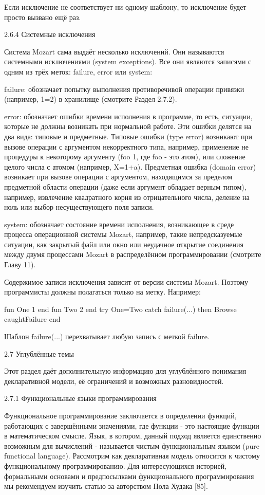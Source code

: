 Если исключение не соответствует ни одному шаблону, то исключение будет просто вызвано ещё раз.

2.6.4 Системные исключения

Система Mozart сама выдаёт несколько исключений. Они называются системными исключениями (system exceptions). Все они являются записями с одним из трёх меток: failure, error или system:

failure: обозначает попытку выполнения противоречивой операции привязки (например, 1=2) в хранилище (смотрите Раздел 2.7.2).

error: обозначает ошибки времени исполнения в программе, то есть, ситуации, которые не должны возникать при нормальной работе. Эти ошибки делятся на два вида: типовые и предметные. Типовые ошибки (type error) возникают при вызове операции с аргументом некорректного типа, например, применение не процедуры к некоторому аргументу ({foo 1}, где foo - это атом), или сложение целого числа с атомом (например, X=1+a). Предметная ошибка (domain error) возникает при вызове операции с аргументом, находящимся за пределом предметной области операции (даже если аргумент обладает верным типом), например, извлечение квадратного корня из отрицательного числа, деление на ноль или выбор несуществующего поля записи.

system: обозначает состояние времени исполнения, возникающее в среде процесса операционной системы Mozart, например, такие непредсказуемые ситуации, как закрытый файл или окно или неудачное открытие соединения между двумя процессами Mozart в распределённом программировании (смотрите Главу 11).

Содержимое записи исключения зависит от версии системы Mozart. Поэтому программисты должны полагаться только на метку. Например:

fun {One} 1 end
fun {Two} 2 end
try {One}={Two}
catch
failure(...) then {Browse caughtFailure}
end

Шаблон failure(...) перехватывает любую запись с меткой failure.

2.7 Углублённые темы

Этот раздел даёт дополнительную информацию для углублённого понимания декларативной модели, её ограничений и возможных разновидностей.

2.7.1 Функциональные языки программирования

Функциональное программирование заключается в определении функций, работающих с завершёнными значениями, где функции - это настоящие функции в математическом смысле. Язык, в котором, данный подход является единственно возможным для вычислений - называется чистым функциональным языком (pure functional language). Рассмотрим как декларативная модель относится к чистому функциональному программированию. Для интересующихся историей, формальными основами и предпосылками функционального программирования мы рекомендуем изучить статью за авторством Пола Худака [85].

